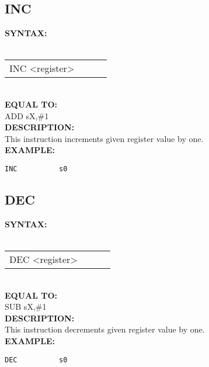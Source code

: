 {                \subsection{INC}
                \textbf{SYNTAX:}\\
                \\ {
                    \texttt{}
                    \begin{tabular}[h!]{llll}
                            { \color{highlight_instruction} INC    } { \color{highlight_symbol} <register> }
                            { \color{highlight_comment}  }\\
                    \end{tabular}
                    }\\
                    \textbf{EQUAL TO:}\\
                    { \color{highlight_instruction} ADD    } { \color{highlight_symbol}      sX,\#1 }
                    \\
                \textbf{DESCRIPTION:}\\
                This instruction increments given register value by one.\\
                \textbf{EXAMPLE:}\\
                        \begin{code}[h!]
                            {\color{highlight_symbol}\verb'INC          s0' }\\
                        \end{code}
                \subsection{DEC}
                \textbf{SYNTAX:}\\
                \\ {
                    \texttt{}
                    \begin{tabular}[h!]{llll}
                            { \color{highlight_instruction} DEC    } { \color{highlight_symbol} <register> }
                            { \color{highlight_comment}  }\\
                    \end{tabular}
                    }\\
                    \textbf{EQUAL TO:}\\
                    { \color{highlight_instruction} SUB    } { \color{highlight_symbol}      sX,\#1 }
                    \\
                \textbf{DESCRIPTION:}\\
                This instruction decrements given register value by one.\\
                \textbf{EXAMPLE:}\\
                        \begin{code}[h!]
                            {\color{highlight_symbol}\verb'DEC          s0' }\\
                        \end{code}


}
